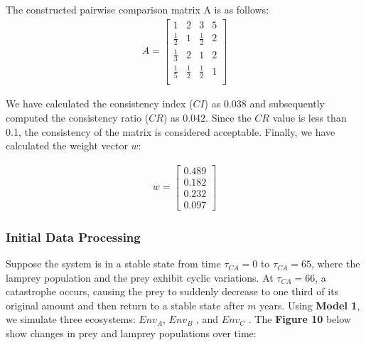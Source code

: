 \documentclass{mcmthesis}
\begin{document}
The constructed pairwise comparison matrix A is as follows:
\begin{align}
A=\left[\begin{matrix}1&2&3&5\\\frac{1}{2}&1&\frac{1}{2}&2\\\frac{1}{3}&2&1&2\\\frac{1}{5}&\frac{1}{2}&\frac{1}{2}&1\\\end{matrix}\right]
\end{align}

We have calculated the consistency index ($CI$) as 0.038 and subsequently computed the consistency ratio ($CR$) as 0.042. Since the $CR$ value is less than 0.1, the consistency of the matrix is considered acceptable. Finally, we have calculated the weight vector $w$:

\begin{align}
w=\begin{bmatrix}
 0.489\\
 0.182\\
0.232\\
0.097
\end{bmatrix}
\end{align}

\subsubsection{Initial Data Processing}
Suppose the system is in a stable state from time $\tau_{CA} = 0$ to $\tau_{CA} = 65$, where the lamprey population and the prey exhibit cyclic variations. At $\tau_{CA} = 66$, a catastrophe occurs, causing the prey to suddenly decrease to one third of its original amount and then return to a stable state after $m$ years. Using \textbf{Model 1}, we simulate three ecosystems: $Env_{A}$, $Env_{B}$ , and $Env_{C}$ . The \textbf{Figure 10} below show changes in prey and lamprey populations over time:
\end{document}
